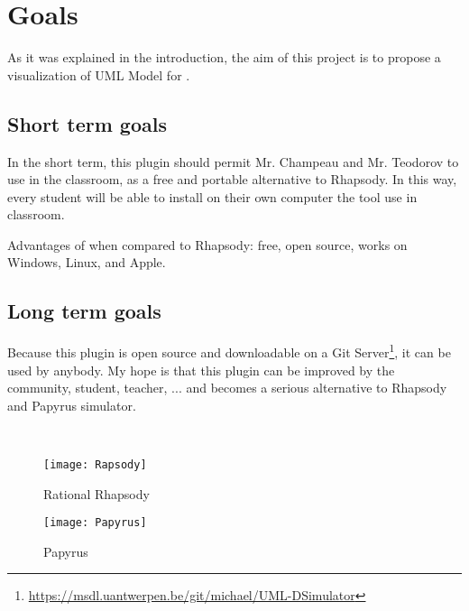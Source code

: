 
\chapter{Goals}
\label{chap:issues}


As it was explained in the introduction, the aim of this project is to propose a visualization of UML Model for \umld.

\section{Short term goals}

In the short term, this plugin should permit Mr. Champeau and Mr. Teodorov to use \umld in the classroom, as a free and portable alternative to Rhapsody. In this way, every student will be able to install on their own computer the tool use in classroom.

Advantages of \umld when compared to Rhapsody: free, open source, works on Windows, Linux, and Apple.

\section{Long term goals}

Because this plugin is open source and downloadable on a Git Server\footnote{\url{https://msdl.uantwerpen.be/git/michael/UML-DSimulator}}, it can be used by anybody. My hope is that this plugin can be improved by the community, student, teacher, \etc... and becomes a serious alternative to Rhapsody and Papyrus simulator.

~\\

  \begin{figure}[h]
    \begin{minipage}{0.45\linewidth}
      \centering
      \texttt{[image: Rapsody]}
      \caption{Rational Rhapsody}
      \label{fig:rhapsody}
    \end{minipage}\hfill
    \begin{minipage}{0.45\linewidth}
      \centering
      \texttt{[image: Papyrus]}
      \caption{Papyrus}
      \label{fig:papyrus}
    \end{minipage}
  \end{figure}


